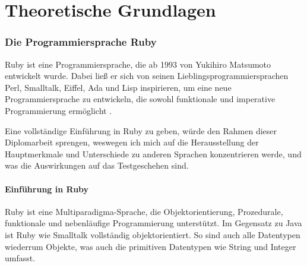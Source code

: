 \part{Theoretische Grundlagen}
\label{sec:theory}

\section{Die Programmiersprache Ruby}

Ruby ist eine Programmiersprache, die ab 1993 von Yukihiro Matsumoto entwickelt wurde. Dabei ließ er sich von seinen Lieblingsprogrammiersprachen Perl, Smalltalk, Eiffel, Ada und Lisp inspirieren, um eine neue Programmiersprache zu entwickeln, die sowohl funktionale und imperative Programmierung ermöglicht \citep{ruby_visual_identity_team_about_2011}. 

Eine vollständige Einführung in Ruby zu geben, würde den Rahmen dieser Diplomarbeit sprengen, weswegen ich mich auf die Herausstellung der Hauptmerkmale und Unterschiede zu anderen Sprachen konzentrieren werde, und was die Auswirkungen auf das Testgeschehen sind.


\subsection{Einführung in Ruby}
Ruby ist eine Multiparadigma-Sprache, die Objektorientierung, Prozedurale, funktionale und nebenläufige Programmierung unterstützt. Im Gegensatz zu Java ist Ruby wie Smalltalk vollständig objektorientiert. So sind auch alle Datentypen wiederrum Objekte, was auch die primitiven Datentypen wie String und Integer umfasst. 

